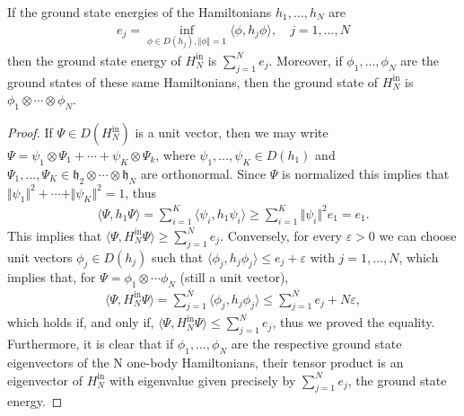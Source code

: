 \begin{theorem}\cite[p.~15]{SolNotes}
	If the ground state energies of the Hamiltonians $h_1,\ldots,h_N$ are
	\begin{align*}
		e_j = \inf_{\phi\in D(h_j),\Vert\phi\Vert=1} \langle\phi,h_j\phi\rangle, \quad j=1,\ldots,N
	\end{align*}
	then the ground state energy of $H_N^{\mathrm{in}}$ is $\sum_{j=1}^N e_j$. Moreover, if
	$\phi_1,\ldots,\phi_N$ are the ground states of these same Hamiltonians, then the ground
	state of $H_N^{\mathrm{in}}$ is $\phi_1 \otimes \cdots \otimes \phi_N$.
\end{theorem}
\begin{proof}
	If $\Psi\in D(H_N^{\mathrm{in}})$ is a unit vector, then we may write $\Psi=\psi_1\otimes\Psi_1+
	\cdots+\psi_K\otimes\Psi_k$, where $\psi_1,\ldots,\psi_K\in D(h_1)$ and $\Psi_1,\ldots,
	\Psi_K\in \mathfrak{h}_2\otimes\cdots\otimes\mathfrak{h}_N$ are orthonormal. Since $\Psi$
	is normalized this implies that $\Vert\psi_1\Vert^2+\cdots+\Vert\psi_K\Vert^2=1$, thus
	\begin{align*}
		\langle\Psi,h_1\Psi\rangle = \sum_{i=1}^K\langle\psi_i,h_1\psi_i\rangle
		\geq \sum_{i=1}^K \Vert\psi_i\Vert^2 e_1 = e_1.
	\end{align*}
	This implies that $\langle\Psi,H_N^{\mathrm{in}}\Psi\rangle \geq \sum_{j=1}^N e_j$.
	Conversely, for every $\varepsilon>0$ we can choose unit vectors $\phi_j\in D(h_j)$ such
	that $\langle\phi_j,h_j\phi_j\rangle\leq e_j+\varepsilon$ with $j=1,\ldots,N$, which
	implies that, for $\Psi = \phi_1\otimes\cdots\phi_N$ (still a unit vector),
	\begin{align*}
		\langle\Psi,H_N^{\mathrm{in}}\Psi\rangle = \sum_{j=1}^N\langle\phi_j,h_j\phi_j\rangle
		\leq \sum_{j=1}^N e_j + N\varepsilon,
	\end{align*}
	which holds if, and only if, $\langle\Psi,H_N^{\mathrm{in}}\Psi\rangle\leq \sum_{j=1}^N e_j$,
	thus we proved the equality. Furthermore, it is clear that if $\phi_1,\ldots,\phi_N$ are
	the respective ground state eigenvectors of the N one-body Hamiltonians, their tensor
	product is an eigenvector of $H_N^{\mathrm{in}}$ with eigenvalue given precisely by
	$\sum_{j=1}^N e_j$, the ground state energy.
\end{proof}

